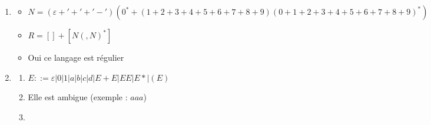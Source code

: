 \begin{enumerate}
	\item 
		\begin{itemize}
			\item $N = (\varepsilon + '+' + '-') (0^* + (1+2+3+4+5+6+7+8+9)(0+1+2+3+4+5+6+7+8+9)^*)$
			\item $R = [] + [N(,N)^*]$
			\item Oui ce langage est régulier
		\end{itemize}

	\item 
		\begin{enumerate}
			\item $E ::= \varepsilon | 0 | 1 | a | b | c | d | E+E | EE | E* | (E)$
			\item Elle est ambigue (exemple : $aaa$)
			\item 
		\end{enumerate}
\end{enumerate}
